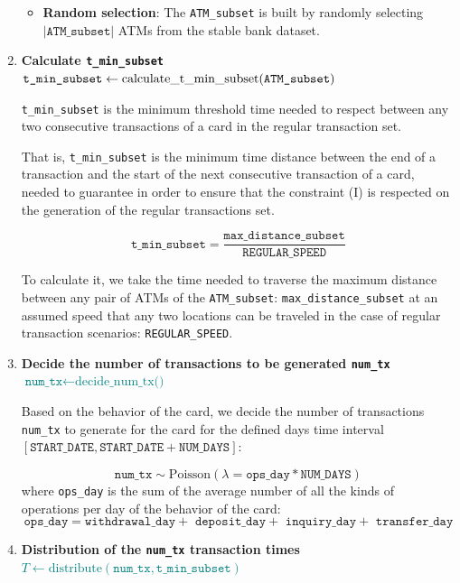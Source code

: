 \begin{enumerate}
\begin{itemize}
        \item \textbf{Random selection}: The \texttt{ATM\_subset} is built by randomly selecting $|\texttt{ATM\_subset}|$ ATMs from the stable bank dataset.
    \end{itemize}

    \item \textbf{Calculate \texttt{t\_min\_subset}} \\
    {\footnotesize\textcolor{teal}{$\texttt{t\_min\_subset} \gets \text{calculate\_t\_min\_subset(\texttt{ATM\_subset})}$}}

    \texttt{t\_min\_subset} is the minimum threshold time needed to respect between any two consecutive transactions of a card in the regular transaction set.
    
    That is, \texttt{t\_min\_subset} is the minimum time distance between the end of a transaction and the start of the next consecutive transaction of a card, needed to guarantee in order to ensure that the constraint (I) is respected on the generation of the regular transactions set.
    
    $$\texttt{t\_min\_subset} = \frac{\texttt{max\_distance\_subset}}{\texttt{REGULAR\_SPEED}}$$

    To calculate it, we take the time needed to traverse the maximum distance between any pair of ATMs of the \texttt{ATM\_subset}: \texttt{max\_distance\_subset} at an assumed speed that any two locations can be traveled in the case of regular transaction scenarios: \texttt{REGULAR\_SPEED}.

    \item \textbf{Decide the number of transactions to be generated \texttt{num\_tx}}\\
    {\footnotesize \textcolor{teal}{$\texttt{num\_tx} \gets \text{decide\_num\_tx()}$}}
    
    Based on the behavior of the card, we decide the number of transactions \texttt{num\_tx} to generate for the card for the defined days time interval $[\texttt{START\_DATE}, \texttt{START\_DATE} + \texttt{NUM\_DAYS}]$:

    $$\texttt{num\_tx} \sim \text{Poisson}(\lambda = \texttt{ops\_day} * \texttt{NUM\_DAYS})$$ where \texttt{ops\_day} is the sum of the average number of all the kinds of operations per day of the behavior of the card: 
    $$\texttt{ops\_day} = \texttt{withdrawal\_day} + \texttt{ deposit\_day} + \texttt{ inquiry\_day} + \texttt{ transfer\_day}$$

    \item \textbf{Distribution of the \texttt{num\_tx} transaction times} \\
     {\footnotesize \textcolor{teal}{$T \gets \text{distribute}(\texttt{num\_tx}, \texttt{t\_min\_subset})$}}
    

\end{enumerate}
